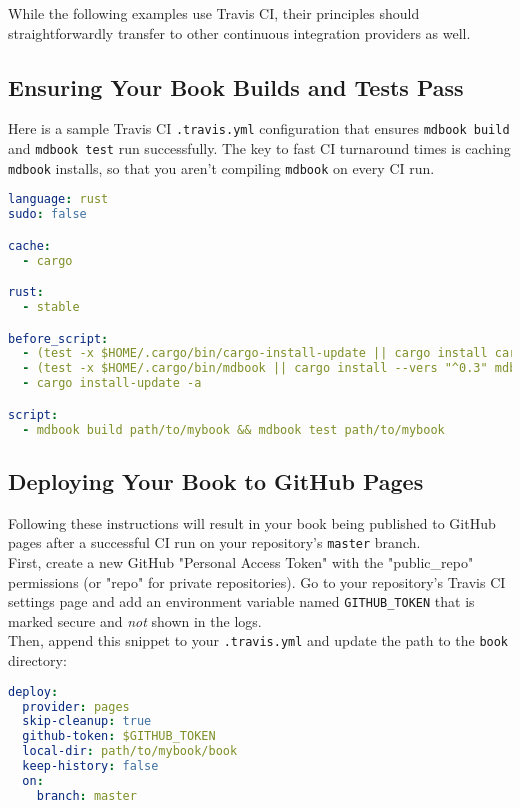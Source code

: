 \documentclass{article}
\begin{document}
While the following examples use Travis CI, their principles should
straightforwardly transfer to other continuous integration providers as well.\\

\subsection{Ensuring Your Book Builds and Tests Pass}
\label{Ensuring Your Book Builds and Tests Pass}
\label{ensuring-your-book-builds-and-tests-pass}

Here is a sample Travis CI \lstinline|.travis.yml| configuration that ensures \lstinline|mdbook build| and \lstinline|mdbook test| run successfully. The key to fast CI turnaround times
is caching \lstinline|mdbook| installs, so that you aren't compiling \lstinline|mdbook| on every CI
run.\\
\begin{lstlisting}[language=yaml]
language: rust
sudo: false

cache:
  - cargo

rust:
  - stable

before_script:
  - (test -x $HOME/.cargo/bin/cargo-install-update || cargo install cargo-update)
  - (test -x $HOME/.cargo/bin/mdbook || cargo install --vers "^0.3" mdbook)
  - cargo install-update -a

script:
  - mdbook build path/to/mybook && mdbook test path/to/mybook

\end{lstlisting}

\subsection{Deploying Your Book to GitHub Pages}
\label{Deploying Your Book to GitHub Pages}
\label{deploying-your-book-to-git-hub-pages}

Following these instructions will result in your book being published to GitHub
pages after a successful CI run on your repository's \lstinline|master| branch.\\

First, create a new GitHub "Personal Access Token" with the "public\_repo"
permissions (or "repo" for private repositories). Go to your repository's Travis
CI settings page and add an environment variable named \lstinline|GITHUB_TOKEN| that is
marked secure and \emph{not} shown in the logs.\\

Then, append this snippet to your \lstinline|.travis.yml| and update the path to the
\lstinline|book| directory:\\
\begin{lstlisting}[language=yaml]
deploy:
  provider: pages
  skip-cleanup: true
  github-token: $GITHUB_TOKEN
  local-dir: path/to/mybook/book
  keep-history: false
  on:
    branch: master

\end{lstlisting}
\end{document}
